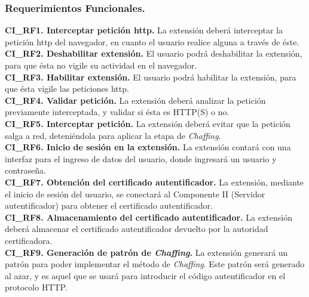 \documentclass[12pt, a4paper, titlepage]{report}
\begin{document}
				\subsubsection{Requerimientos Funcionales.}
				{\setlength{\parindent}{12pt}
				
			    \textbf{CI\_RF1. Interceptar petición \acrshort{http}.} La extensión deberá interceptar la petición \acrshort{http} del navegador, en cuanto el usuario realice alguna a través de éste.\\

				\textbf{CI\_RF2. Deshabilitar extensión.} El usuario podrá deshabilitar la extensión, para que ésta no vigile su actividad en el navegador.\\
				
				\textbf{CI\_RF3. Habilitar extensión.} El usuario podrá habilitar la extensión, para que ésta vigile las peticiones \acrshort{http}.\\
				
				\textbf{CI\_RF4. Validar petición.} La extensión deberá analizar la petición previamente interceptada, y validar si ésta es HTTP(S) o no.\\
				
				\textbf{CI\_RF5. Interceptar petición.} La extensión deberá evitar que la petición salga a red, deteniéndola para aplicar la etapa de \textit{Chaffing}.\\ 
				
				\textbf{CI\_RF6. Inicio de sesi\'on en la extensi\'on.} La extensi\'on contar\'a con una interfaz para el ingreso de datos del usuario, donde ingresará un usuario y contraseña. \\  
				
                \textbf{CI\_RF7. Obtención del certificado autentificador.} La extensión, mediante el inicio de sesión del usuario, se conectará al Componente II (Servidor autentificador) para obtener el certificado autentificador.\\ 
                
                \textbf{CI\_RF8. Almacenamiento del certificado autentificador.} La extensi\'on deberá almacenar el certificado autentificador devuelto por la autoridad certificadora.\\
                
                \textbf{CI\_RF9. Generación de patrón de \textit{Chaffing}.} La extensión generará un patrón para poder implementar el método de \textit{Chaffing}. Este patrón será generado al azar, y es aquel que se usará para introducir el código autentificador en el protocolo HTTP.\\
                
}
\end{document}
